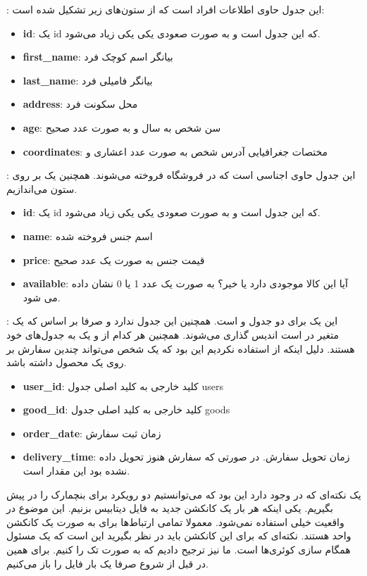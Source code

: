 :
این جدول حاوی اطلاعات افراد است که از ستون‌های زیر تشکیل شده است:
\begin{itemize}
    \item \textbf{id}: یک id که  این جدول است و به صورت صعودی یکی یکی زیاد می‌شود.
    \item \textbf{first\_name}: بیانگر اسم کوچک فرد
    \item \textbf{last\_name}: بیانگر فامیلی فرد
    \item \textbf{address}: محل سکونت فرد
    \item \textbf{age}: سن شخص به سال و به صورت عدد صحیح
    \item \textbf{coordinates}: مختصات جغرافیایی آدرس شخص به صورت عدد اعشاری و 
\end{itemize}
:
این جدول حاوی اجناسی است که در فروشگاه فروخته می‌شوند. همچنین یک
بر روی ستون
می‌اندازیم.
\begin{itemize}
    \item \textbf{id}: یک id که  این جدول است و به صورت صعودی یکی یکی زیاد می‌شود.
    \item \textbf{name}: اسم جنس فروخته شده
    \item \textbf{price}: قیمت جنس به صورت یک عدد صحیح
    \item \textbf{available}: آیا این کالا موجودی دارد یا خیر؟ به صورت یک عدد 1 یا 0 نشان داده می شود.
\end{itemize}
:
این یک
برای دو جدول
 و 
است. همچنین این جدول
ندارد و صرفا بر اساس
که یک متغیر
 در 
است اندیس گذاری می‌شوند. همچنین هر کدام از
 و 
یک
به جدول‌های خود هستند. دلیل اینکه از
استفاده نکردیم این بود که یک شخص می‌تواند چندین سفارش بر روی یک محصول داشته باشد.
\begin{itemize}
    \item \textbf{user\_id}: کلید خارجی به کلید اصلی جدول users
    \item \textbf{good\_id}: کلید خارجی به کلید اصلی جدول goods
    \item \textbf{order\_date}: زمان ثبت سفارش
    \item \textbf{delivery\_time}: زمان تحویل سفارش. در صورتی که سفارش هنوز تحویل داده نشده بود این مقدار  است.
\end{itemize}
یک نکته‌ای که در
وجود دارد این بود که می‌توانستیم دو رویکرد برای بنچمارک را در پیش بگیریم.
یکی اینکه هر بار یک کانکشن جدید به فایل دیتابیس بزنیم. این موضوع در واقعیت خیلی استفاده نمی‌شود.
معمولا تمامی ارتباط‌ها برای
به صورت یک کانکشن واحد هستند. نکته‌ای که برای این کانکشن باید در نظر بگیرید این است که یک
مسئول همگام سازی کوئری‌ها است. ما نیز ترجیح دادیم که به صورت تک
 را 
کنیم. برای همین در قبل از شروع
صرفا یک بار فایل را باز می‌کنیم.
